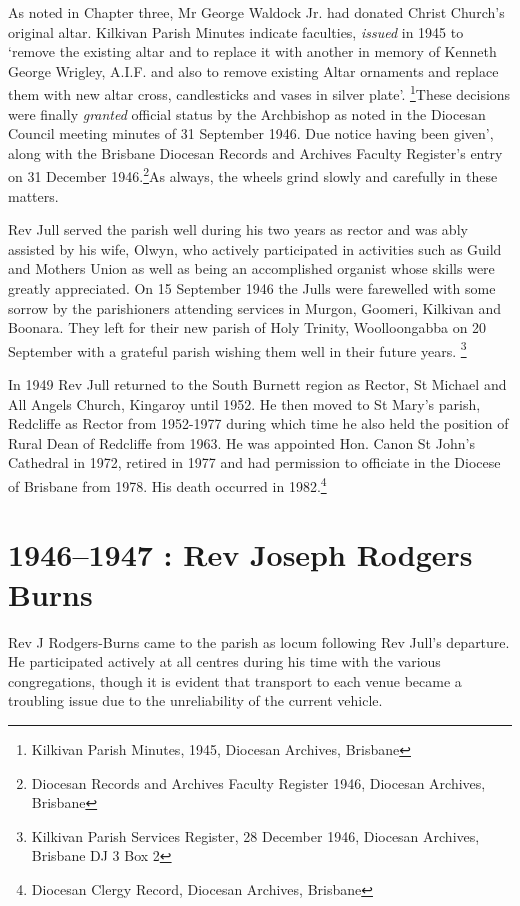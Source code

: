 As noted in Chapter three, Mr George Waldock Jr. had donated Christ
Church's original altar. Kilkivan Parish Minutes indicate faculties,
\emph{issued} in 1945 to `remove the existing altar and to replace it
with another in memory of Kenneth George Wrigley, A.I.F. and also to
remove existing Altar ornaments and replace them with new altar cross,
candlesticks and vases in silver plate'. \footnote{Kilkivan Parish
  Minutes, 1945, Diocesan Archives, Brisbane}These decisions were
finally \emph{granted} official status by the Archbishop as noted in the
Diocesan Council meeting minutes of 31 September 1946. Due notice having
been given', along with the Brisbane Diocesan Records and Archives
Faculty Register's entry on 31 December 1946.\footnote{Diocesan Records
  and Archives Faculty Register 1946, Diocesan Archives, Brisbane}As
always, the wheels grind slowly and carefully in these matters.

Rev Jull served the parish well during his two years as rector and was
ably assisted by his wife, Olwyn, who actively participated in
activities such as Guild and Mothers Union as well as being an
accomplished organist whose skills were greatly appreciated. On 15
September 1946 the Julls were farewelled with some sorrow by the
parishioners attending services in Murgon, Goomeri, Kilkivan and
Boonara. They left for their new parish of Holy Trinity, Woolloongabba
on 20 September with a grateful parish wishing them well in their future
years. \footnote{Kilkivan Parish Services Register, 28 December 1946,
  Diocesan Archives, Brisbane DJ 3 Box 2}

In 1949 Rev Jull returned to the South Burnett region as Rector, St
Michael and All Angels Church, Kingaroy until 1952. He then moved to St
Mary's parish, Redcliffe as Rector from 1952-1977 during which time he
also held the position of Rural Dean of Redcliffe from 1963. He was
appointed Hon. Canon St John's Cathedral in 1972, retired in 1977 and
had permission to officiate in the Diocese of Brisbane from 1978. His
death occurred in 1982.\footnote{Diocesan Clergy Record, Diocesan
  Archives, Brisbane}

\section{1946--1947 : Rev Joseph Rodgers
Burns}

Rev J Rodgers-Burns came to the parish as locum following Rev Jull's
departure. He participated actively at all centres during his time with
the various congregations, though it is evident that transport to each
venue became a troubling issue due to the unreliability of the current
vehicle.

